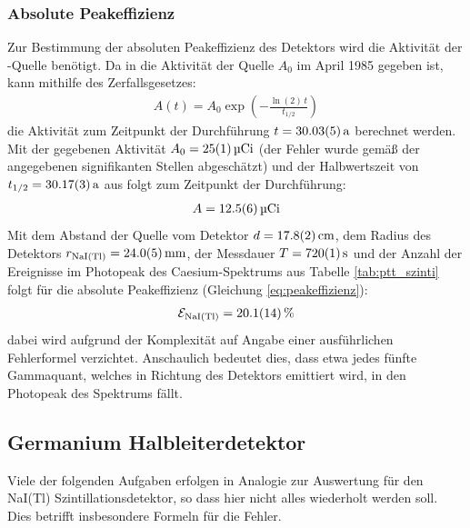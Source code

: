 \documentclass[11pt, a4paper]{article}
\numberwithin{equation}{section}
\newcommand{\cs}{\isotope[137]{Cs}}
\begin{document}
\subsubsection{Absolute Peakeffizienz}
\label{sec:absolute_peakeffizienz_szinti}
Zur Bestimmung der absoluten Peakeffizienz des Detektors wird die Aktivität der \cs{}-Quelle benötigt. Da in \cite{anleitung} die Aktivität der Quelle $A_0$ im April 1985 gegeben ist, kann mithilfe des Zerfallsgesetzes:
\begin{align}
	A(t) = A_0 \exp\left( - \frac{\ln(2)\, t}{t_{1/2}} \right)
\end{align}
die Aktivität zum Zeitpunkt der Durchführung $t = \SI{30.03 +- 0.05}{a}$ berechnet werden.
Mit der gegebenen Aktivität $A_0 = \SI{25 +- 1}{\micro Ci}$ (der Fehler wurde gemäß der angegebenen signifikanten Stellen abgeschätzt) und der Halbwertszeit von \cs{} $t_{1/2} = \SI{30.17 +- 0.03}{a}$ aus \cite{nist} folgt zum Zeitpunkt der Durchführung:
\begin{align}
	\label{eq:aktivitaet_caesium}
	A = \SI{12.5 +- 0.6}{\micro Ci}
\end{align}
Mit dem Abstand der Quelle vom Detektor $d = \SI{17.8 +- 0.2}{cm}$, dem Radius des Detektors $r_\mathrm{NaI(Tl)} = \SI{24 +- 0.5}{mm}$, der Messdauer $T = \SI{720 +- 1}{\second}$ und der Anzahl der Ereignisse im Photopeak des Caesium-Spektrums aus Tabelle \ref{tab:ptt_szinti} folgt für die absolute Peakeffizienz (Gleichung \ref{eq:peakeffizienz}):
\begin{align}
	\mathcal{E}_\mathrm{NaI(Tl)} = \SI{20.1 +- 1.4}{\percent}
\end{align}
dabei wird aufgrund der Komplexität auf Angabe einer ausführlichen Fehlerformel verzichtet.
Anschaulich bedeutet dies, dass etwa jedes fünfte Gammaquant, welches in Richtung des Detektors emittiert wird, in den Photopeak des Spektrums fällt.

\subsection{Germanium Halbleiterdetektor}
Viele der folgenden Aufgaben erfolgen in Analogie zur Auswertung für den NaI(Tl) Szintillationsdetektor, so dass hier nicht alles wiederholt werden soll.
Dies betrifft insbesondere Formeln für die Fehler.
\end{document}
